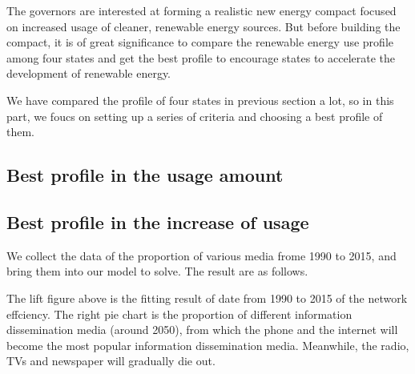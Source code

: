 \documentclass[a4paper,11pt]{article}
\begin{document}
\par The governors are interested at forming a realistic new energy compact focused on increased usage of cleaner, renewable energy sources. But before building the compact, it is of great significance to compare the renewable energy use profile among four states and get the best profile to encourage states to accelerate the development of renewable energy.

\par We have compared the profile of four states in previous section a lot, so in this part, we foucs on setting up a series of criteria and choosing a best profile of them. 

\subsection{Best profile in the usage amount}
\par 

\subsection{Best profile in the increase of usage}

\par We collect the data of the proportion of various media frome 1990 to 2015, and bring them into our model to solve. The result are as follows.

\par The lift figure above is the fitting result of date from 1990 to 2015\cite{RK} of the network effciency. The right  pie chart is the proportion of different information dissemination media (around 2050), from which the phone and the internet will become the most popular information dissemination media. Meanwhile, the radio, TVs and newspaper will gradually die out.
\end{document}
